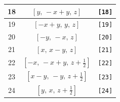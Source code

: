 \documentclass[fleqn,8pt]{jsarticle}
\begin{document}
\begin{longtable}{ccc}
18 & $\left[ y,\, - x + y,\, z \right]$ & {\tt [18]} \\ \hline
19 & $\left[ - x + y,\, y,\, z \right]$ & {\tt [19]} \\ \hline
20 & $\left[ - y,\, - x,\, z \right]$ & {\tt [20]} \\ \hline
21 & $\left[ x,\, x - y,\, z \right]$ & {\tt [21]} \\ \hline
22 & $\left[ - x,\, - x + y,\, z + \frac{1}{2} \right]$ & {\tt [22]} \\ \hline
23 & $\left[ x - y,\, - y,\, z + \frac{1}{2} \right]$ & {\tt [23]} \\ \hline
24 & $\left[ y,\, x,\, z + \frac{1}{2} \right]$ & {\tt [24]} \\
\end{longtable}
\end{document}

